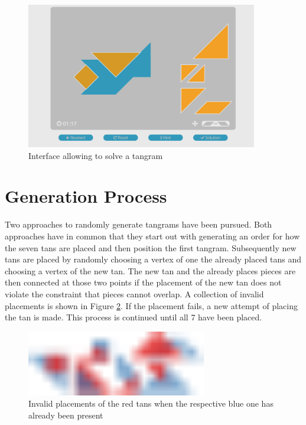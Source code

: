 \begin{figure}
\centering
    \includegraphics[width=0.9\textwidth]{figures/game.png}
  \caption{Interface allowing to solve a tangram}  
  \label{game}
\end{figure}

\section{Generation Process}
\label{generate}

Two approaches to randomly generate tangrams have been pursued. Both approaches have in common that they start out with generating an order for how the seven tans are placed and then position the first tangram. Subsequently new tans are placed by randomly choosing a vertex of one the already placed tans and choosing a vertex of the new tan. The new tan and the already places pieces are then connected at those two points if the placement of the new tan does not violate the constraint that pieces cannot overlap. A collection of invalid placements is shown in Figure \ref{overlap}. If the placement fails, a new attempt of placing the tan is made. This process is continued until all 7 have been placed. 

\begin{figure}
\centering
    \includegraphics[width=0.7\textwidth]{figures/overlap.pdf}
  \caption{Invalid placements of the red tans when the respective blue one has already been present}  
  \label{overlap}
\end{figure}

